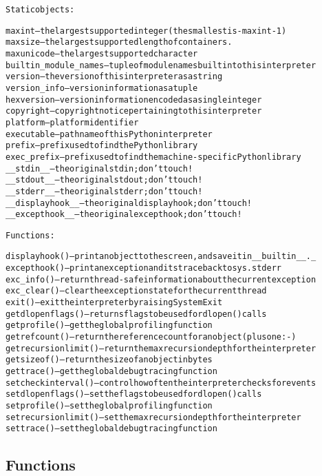 \begin{alltt}
Static objects:

maxint -- the largest supported integer (the smallest is -maxint-1)
maxsize -- the largest supported length of containers.
maxunicode -- the largest supported character
builtin\_module\_names -- tuple of module names built into this interpreter
version -- the version of this interpreter as a string
version\_info -- version information as a tuple
hexversion -- version information encoded as a single integer
copyright -- copyright notice pertaining to this interpreter
platform -- platform identifier
executable -- pathname of this Python interpreter
prefix -- prefix used to find the Python library
exec\_prefix -- prefix used to find the machine-specific Python library
\_\_stdin\_\_ -- the original stdin; don't touch!
\_\_stdout\_\_ -- the original stdout; don't touch!
\_\_stderr\_\_ -- the original stderr; don't touch!
\_\_displayhook\_\_ -- the original displayhook; don't touch!
\_\_excepthook\_\_ -- the original excepthook; don't touch!

Functions:

displayhook() -- print an object to the screen, and save it in \_\_builtin\_\_.\_
excepthook() -- print an exception and its traceback to sys.stderr
exc\_info() -- return thread-safe information about the current exception
exc\_clear() -- clear the exception state for the current thread
exit() -- exit the interpreter by raising SystemExit
getdlopenflags() -- returns flags to be used for dlopen() calls
getprofile() -- get the global profiling function
getrefcount() -- return the reference count for an object (plus one :-)
getrecursionlimit() -- return the max recursion depth for the interpreter
getsizeof() -- return the size of an object in bytes
gettrace() -- get the global debug tracing function
setcheckinterval() -- control how often the interpreter checks for events
setdlopenflags() -- set the flags to be used for dlopen() calls
setprofile() -- set the global profiling function
setrecursionlimit() -- set the max recursion depth for the interpreter
settrace() -- set the global debug tracing function
\end{alltt}



  \subsection{Functions}

